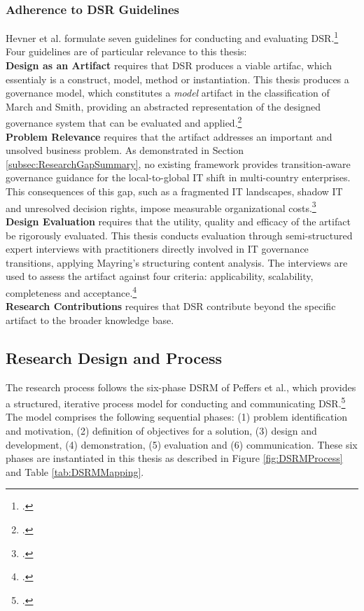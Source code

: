 \subsubsection{Adherence to DSR Guidelines}
\label{subsubsec:AdherenceToDSRGuidelines}
Hevner et al. formulate seven guidelines for conducting and evaluating DSR.\footcite[83-90]{hevnerDesignScienceInformation2004}
Four guidelines are of particular relevance to this thesis:
\\
\textbf{Design as an Artifact} requires that \ac{DSR} produces a viable artifac, which essentialy is a construct, model, method or instantiation.
This thesis produces a governance model, which constitutes a \textit{model} artifact in the classification of March and Smith, providing an abstracted representation of the designed governance system that can be evaluated and applied.\footcite[84]{hevnerDesignScienceInformation2004}
\\
\textbf{Problem Relevance} requires that the artifact addresses an important and unsolved business problem.
As demonstrated in Section \ref{subsec:ResearchGapSummary}, no existing framework provides transition-aware governance guidance for the local-to-global IT shift in multi-country enterprises.
This consequences of this gap, such as a fragmented IT landscapes, shadow IT and unresolved decision rights, impose measurable organizational costs.\footcite[84-85]{hevnerDesignScienceInformation2004}
\\
\textbf{Design Evaluation} requires that the utility, quality and efficacy of the artifact be rigorously evaluated.
This thesis conducts evaluation through semi-structured expert interviews with practitioners directly involved in IT governance transitions, applying Mayring's structuring content analysis.
The interviews are used to assess the artifact against four criteria: applicability, scalability, completeness and acceptance.\footcite[86-87]{hevnerDesignScienceInformation2004}
\\
\textbf{Research Contributions} requires that \ac{DSR} contribute beyond the specific artifact to the broader knowledge base.

\subsection{Research Design and Process}
\label{subsec:ResearchDesignAndProcess}
The research process follows the six-phase \ac{DSRM} of Peffers et al., which provides a structured, iterative process model for conducting and communicating \ac{DSR}.\footcite[52-56]{peffersDesignScienceResearch2007}
The model comprises the following sequential phases: (1) problem identification and motivation, (2) definition of objectives for a solution, (3) design and development, (4) demonstration, (5) evaluation and (6) communication.
These six phases are instantiated in this thesis as described in Figure \ref{fig:DSRMProcess} and Table \ref{tab:DSRMMapping}.

